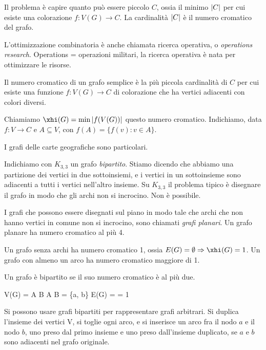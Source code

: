 	Il problema \`e capire quanto pu\`o essere piccolo $C$, ossia il minimo $\left\lvert{C}\right\rvert$ per cui esiste una colorazione $f : V(G) \to C$.
	La cardinalit\`a $\left\lvert{C}\right\rvert$ \`e il numero cromatico del grafo.

	L'ottimizzazione combinatoria \`e anche chiamata ricerca operativa, o \emph{operations research}.
	Operations = operazioni militari, la ricerca operativa \`e nata per ottimizzare le risorse.

	\begin{defn}
		Il numero cromatico di un grafo semplice \`e la pi\`u piccola cardinalit\`a di $C$ per cui esiste una funzione $f : V(G) \to C$ di colorazione che ha vertici adiacenti con colori diversi.
	\end{defn}

	Chiamiamo $\xhi(G) = \min \abs{f(V(G))}$ questo numero cromatico.
	Indichiamo, data $f : V \to C$ e $A \subseteq V$, con $f(A) = \{ f(v) : v \in A \}$.

	I grafi delle carte geografiche sono particolari.

	Indichiamo con $K_{3,3}$ un grafo \emph{bipartito}.
	Stiamo dicendo che abbiamo una partizione dei vertici in due sottoinsiemi, e i vertici in un sottoinsieme sono adiacenti a tutti i vertici nell'altro insieme.
	Su $K_{3,3}$ il problema tipico \`e disegnare il grafo in modo che gli archi non si incrocino.
	Non \`e possibile.

	I grafi che possono essere disegnati sul piano in modo tale che archi che non hanno vertici in comune non si incrocino, sono chiamati \emph{grafi planari}.
	Un grafo planare ha numero cromatico al pi\`u 4.

	Un grafo senza archi ha numero cromatico 1, ossia $E(G) = \emptyset \implies \xhi(G) = 1$.
	Un grafo con almeno un arco ha numero cromatico maggiore di 1.

	\begin{defn}
		Un grafo \`e  bipartito se il suo numero cromatico \`e al pi\`u due.
	\end{defn}

	V(G) = A \cup B
	A \cap B = \emptyset
	\forall \{a, b\} \in E(G)  =  = 1

	Si possono usare grafi bipartiti per rappresentare grafi arbitrari.
	Si duplica l'insieme dei vertici V, si toglie ogni arco, e si inserisce un arco fra il nodo $a$ e il nodo $b$, uno preso dal primo insieme e uno preso dall'insieme duplicato, se $a$ e $b$ sono adiacenti nel grafo originale.

